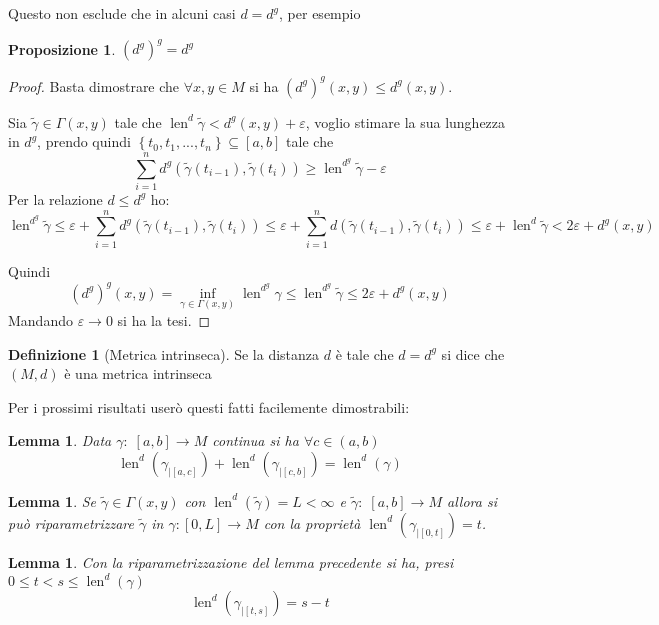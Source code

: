 \documentclass[a4paper,10pt]{article}
\newcounter{counter1}
\theoremstyle{plain}
\newtheorem{mylem}[counter1]{Lemma}
\newtheorem{mypro}[counter1]{Proposizione}
\theoremstyle{definition}
\newtheorem{mydef}[counter1]{Definizione}
\theoremstyle{remark}
\newcommand{\set}[1]{\left\{#1\right\}}
\newcommand{\pa}[1]{\left(#1\right)}
\newcommand{\bra}[1]{\left[#1\right]}
\DeclareMathOperator{\len}{len}
\begin{document}
Questo non esclude che in alcuni casi $d = d^g$, per esempio
\begin{mypro}
  $\pa{d^g}^g = d^g$
\end{mypro}
\begin{proof}
  Basta dimostrare che $\forall x,y \in M$ si ha $\pa{d^g}^g(x,y) \le
  d^g(x,y)$.

  Sia $\tilde\gamma \in \Gamma(x,y)$ tale che $\len ^d \tilde\gamma <
  d^g(x,y) + \varepsilon$, voglio stimare la sua lunghezza in $d^g$,
  prendo quindi $\set{t_0,t_1,...,t_n} \subseteq \bra{a,b}$ tale che
  \[ \sum _{i=1} ^n d^g(\tilde\gamma(t_{i-1}),\tilde\gamma(t_i)) \ge
  \len ^{d^g} \tilde\gamma - \varepsilon \] Per la relazione $d\le
  d^g$ ho:
  \[ \len ^{d^g} \tilde\gamma \le \varepsilon + \sum _{i=1} ^n
  d^g(\tilde\gamma(t_{i-1}),\tilde\gamma(t_i)) \le \varepsilon + \sum
  _{i=1} ^n d(\tilde\gamma(t_{i-1}),\tilde\gamma(t_i)) \le \varepsilon
  + \len ^d \tilde\gamma < 2 \varepsilon + d^g(x,y) \]

  Quindi
  \[ \pa{d^g}^g (x,y) = \inf _{\gamma \in \Gamma(x,y)} \len ^{d^g}
  \gamma \le \len ^{d^g} \tilde\gamma \le 2 \varepsilon + d^g(x,y) \]
  Mandando $\varepsilon \to 0$ si ha la tesi.
\end{proof}

\begin{mydef}[Metrica intrinseca]
  Se la distanza $d$ è tale che $d = d^g$ si dice che $(M,d)$ è una
  metrica intrinseca
\end{mydef}

Per i prossimi risultati userò questi fatti facilemente dimostrabili:
\begin{mylem}
  Data $\gamma:\; \bra{a,b} \to M$ continua si ha $\forall c \in
  \pa{a,b}$
  \[ \len ^d (\gamma_{|\bra{a,c}}) +  \len ^d (\gamma_{|\bra{c,b}}) = 
  \len ^d (\gamma) \] 
\end{mylem}
\begin{mylem}
  Se $\tilde \gamma \in \Gamma (x,y)$ con $\len ^d (\tilde \gamma) = L
  < \infty$ e $\tilde \gamma : \; \bra {a,b} \to M$ allora si può
  riparametrizzare $\tilde \gamma$ in $\gamma : \bra{0,L} \to M$ con la
  proprietà $\len ^d(\gamma_{| \bra{0,t}}) = t$.
\end{mylem}
\begin{mylem}
  Con la riparametrizzazione del lemma precedente si ha, presi $0 \le
  t < s \le \len ^d (\gamma)$
  \[ \len ^d (\gamma _{|\bra{t,s}}) = s - t \]
\end{mylem}
\end{document}
